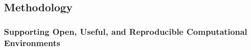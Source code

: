 
\subsection{Methodology}\label{sec:concept_methodology}


%
%
%
%

\subsubsection{Supporting Open, Useful, and Reproducible Computational
  Environments}\label{sec:SOURCE}

